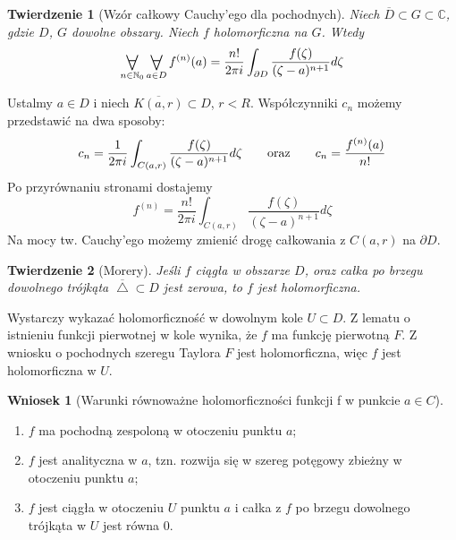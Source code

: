 \documentclass[11pt]{article}
\newcommand{\closure}[1]{\overline{#1}} %
\newcommand{\Forall}[1]{\mathop{\vcenter{\hbox{\LARGE$\forall$}}}\limits_{#1}} %
\theoremstyle{plain}
\newtheorem*{theorem}{Twierdzenie}
\theoremstyle{definition}
\newtheorem*{corollary}{Wniosek}
\theoremstyle{remark}
\let\oldendproof\endproof
\renewenvironment{proof}[1][\proofname]{
  \oldproof[\textsc{\small #1}]
}{\oldendproof}
\begin{document}
\begin{theorem}[Wzór całkowy Cauchy'ego dla pochodnych]
  Niech $ \closure{D} \subset G \subset \mathbb{C} $, gdzie $ D $, $ G $ dowolne obszary.
  Niech $ f $ holomorficzna na $ G $.
  Wtedy
  $$ \Forall{n \in \mathbb{N}_0} \Forall{a \in D} f^{(n)}(a) = \frac{n!}{2 \pi i} \int_{\partial D} \frac{f(\zeta)}{(\zeta - a)^{n+1}} d\zeta $$
\end{theorem}

\begin{proof}
  Ustalmy $ a \in D $ i niech $ \closure{K(a, r)} \subset D $, $ r < R $.
  Współczynniki $ c_n $ możemy przedstawić na dwa sposoby:
  $$
    c_n = \frac{1}{2 \pi i} \int_{C(a, r)} \frac{f(\zeta)}{(\zeta-a)^{n+1}} d\zeta
    \qquad \textnormal{oraz} \qquad
    c_n = \frac{f^{(n)}(a)}{n!}
  $$
  Po przyrównaniu stronami dostajemy
  $$
    f^{(n)} = \frac{n!}{2 \pi i} \int_{C(a, r)} \frac{f(\zeta)}{(\zeta-a)^{n+1}} d\zeta
  $$
  Na mocy tw. Cauchy'ego możemy zmienić drogę całkowania z $ C(a, r) $ na $ \partial D $.
\end{proof}

\begin{theorem}[Morery]
  Jeśli $ f $ ciągła w obszarze $ D $, oraz
  całka po brzegu dowolnego trójkąta $ \closure{\bigtriangleup} \subset D $ jest zerowa,
  to $ f $ jest holomorficzna.
\end{theorem}

\begin{proof}
  Wystarczy wykazać holomorficzność w dowolnym kole $ U \subset D $.
  Z lematu o istnieniu funkcji pierwotnej w kole wynika, że $ f $ ma funkcję pierwotną $ F $.
  Z wniosku o pochodnych szeregu Taylora $ F $ jest holomorficzna, więc $ f $ jest holomorficzna w $ U $.
\end{proof}

\begin{corollary}[Warunki równoważne holomorficzności funkcji f w punkcie $ a \in C $]
  $ $
  \begin{enumerate}
    \item $ f $ ma pochodną zespoloną w otoczeniu punktu $ a $; \label{war-holo-pochodna}
    \item $ f $ jest analityczna w $ a $, tzn. rozwija się w szereg potęgowy zbieżny w otoczeniu punktu $ a $; \label{war-holo-anal}
    \item $ f $ jest ciągła w otoczeniu $ U $ punktu $ a $ i całka z $ f $ po brzegu dowolnego trójkąta w $ U $ jest równa $ 0 $. \label{war-holo-troj}
  \end{enumerate}
\end{corollary}
\end{document}
